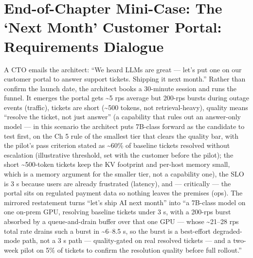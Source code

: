 \section{End-of-Chapter Mini-Case: The `Next Month' Customer Portal:
Requirements
Dialogue}\label{end-of-chapter-mini-case-the-next-month-customer-portal-requirements-dialogue}

A CTO emails the architect: ``We heard LLMs are great --- let's put one
on our customer portal to answer support tickets. Shipping it next
month.'' Rather than confirm the launch date, the architect books a
30-minute session and runs the funnel. It emerges the portal gets
\textasciitilde5 rps average but 200-rps bursts during outage events
(traffic), tickets are short (\textasciitilde500 tokens, not
retrieval-heavy), quality means ``resolve the ticket, not just answer''
(a capability that rules out an answer-only model --- in this scenario
the architect puts 7B-class forward as the candidate to test first, on
the Ch 5 rule of the smallest tier that clears the quality bar, with the
pilot's pass criterion stated as \textasciitilde60\% of baseline tickets
resolved without escalation (illustrative threshold, set with the
customer before the pilot); the short \textasciitilde500-token tickets
keep the KV footprint and per-host memory small, which is a memory
argument for the smaller tier, not a capability one), the SLO is 3 s
because users are already frustrated (latency), and --- critically ---
the portal sits on regulated payment data so nothing leaves the premises
(ops). The mirrored restatement turns ``let's ship AI next month'' into
``a 7B-class model on one on-prem GPU, resolving baseline tickets under
3 s, with a 200-rps burst absorbed by a queue-and-drain buffer over that
one GPU --- whose \textasciitilde21--28 rps total rate drains such a
burst in \textasciitilde6--8.5 s, so the burst is a best-effort
degraded-mode path, not a 3 s path --- quality-gated on real resolved
tickets --- and a two-week pilot on 5\% of tickets to confirm the
resolution quality before full rollout.''

